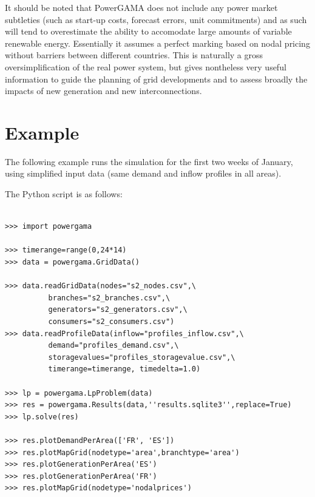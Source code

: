 \documentclass{article}
\begin{document}
It should be noted that PowerGAMA does not include any power market subtleties (such as start-up costs, forecast errors, unit commitments) and as such will tend to overestimate the ability to accomodate large amounts of variable renewable energy. Essentially it assumes a perfect marking based on nodal pricing without barriers between different countries. This is naturally a gross oversimplification of the real power system, but gives nontheless very useful information to guide the planning of grid developments and to assess broadly the impacts of new generation and new interconnections.

\section{Example}

The following example runs the simulation for the first two weeks of January, using simplified input data (same demand and inflow profiles in all areas).

The Python script is as follows: 

\begin{lstlisting}

>>> import powergama

>>> timerange=range(0,24*14)
>>> data = powergama.GridData()

>>> data.readGridData(nodes="s2_nodes.csv",\
          branches="s2_branches.csv",\
          generators="s2_generators.csv",\
          consumers="s2_consumers.csv")
>>> data.readProfileData(inflow="profiles_inflow.csv",\
          demand="profiles_demand.csv",\
          storagevalues="profiles_storagevalue.csv",\
          timerange=timerange, timedelta=1.0)

>>> lp = powergama.LpProblem(data)
>>> res = powergama.Results(data,''results.sqlite3'',replace=True)
>>> lp.solve(res)

>>> res.plotDemandPerArea(['FR', 'ES'])
>>> res.plotMapGrid(nodetype='area',branchtype='area')
>>> res.plotGenerationPerArea('ES')
>>> res.plotGenerationPerArea('FR')
>>> res.plotMapGrid(nodetype='nodalprices')

\end{lstlisting}
\end{document}
